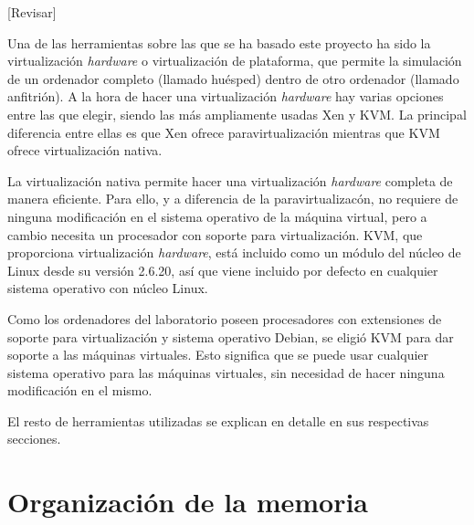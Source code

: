 [Revisar]

Una de las herramientas sobre las que se ha basado este proyecto ha sido la virtualización \emph{hardware} o virtualización de plataforma, que permite la simulación de un ordenador completo (llamado huésped) dentro de otro ordenador (llamado anfitrión). A la hora de hacer una virtualización \emph{hardware} hay varias opciones entre las que elegir, siendo las más ampliamente usadas Xen y KVM. La principal diferencia entre ellas es que Xen ofrece paravirtualización mientras que KVM ofrece virtualización nativa.

La virtualización nativa permite hacer una virtualización \emph{hardware} completa de manera eficiente. Para ello, y a diferencia de la paravirtualizacón, no requiere de ninguna modificación en el sistema operativo de la máquina virtual, pero a cambio necesita un procesador con soporte para virtualización. KVM, que proporciona virtualización \emph{hardware}, está incluido como un módulo del núcleo de Linux desde su versión 2.6.20, así que viene incluido por defecto en cualquier sistema operativo con núcleo Linux.

Como los ordenadores del laboratorio poseen procesadores con extensiones de soporte para virtualización y sistema operativo Debian, se eligió KVM para dar soporte a las máquinas virtuales. Esto significa que se puede usar cualquier sistema operativo para las máquinas virtuales, sin necesidad de hacer ninguna modificación en el mismo.

El resto de herramientas utilizadas se explican en detalle en sus respectivas secciones.


\section{Organización de la memoria}


